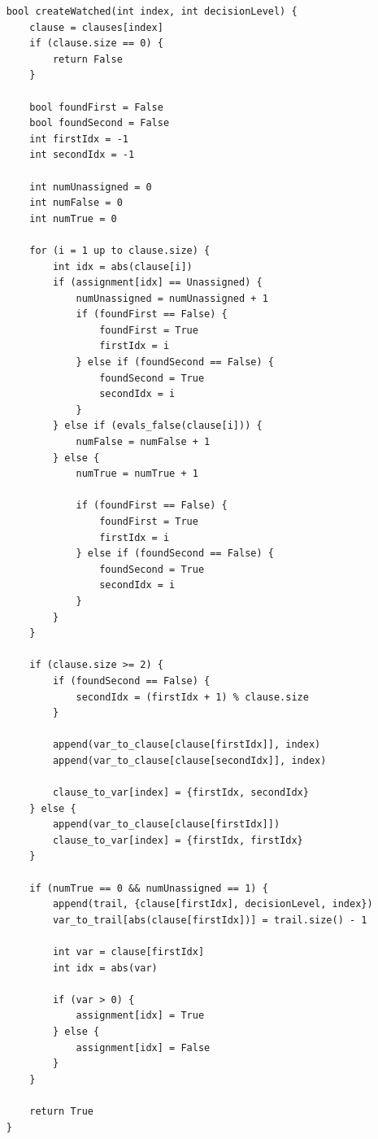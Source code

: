 \documentclass[../main.tex]{subfiles}
\begin{document}
\begin{lstlisting}
    bool createWatched(int index, int decisionLevel) {
        clause = clauses[index]
        if (clause.size == 0) {
            return False
        }

        bool foundFirst = False 
        bool foundSecond = False 
        int firstIdx = -1
        int secondIdx = -1

        int numUnassigned = 0
        int numFalse = 0
        int numTrue = 0

        for (i = 1 up to clause.size) {
            int idx = abs(clause[i])
            if (assignment[idx] == Unassigned) {
                numUnassigned = numUnassigned + 1
                if (foundFirst == False) {
                    foundFirst = True
                    firstIdx = i
                } else if (foundSecond == False) {
                    foundSecond = True 
                    secondIdx = i
                }
            } else if (evals_false(clause[i])) {
                numFalse = numFalse + 1
            } else {
                numTrue = numTrue + 1

                if (foundFirst == False) {
                    foundFirst = True
                    firstIdx = i
                } else if (foundSecond == False) {
                    foundSecond = True 
                    secondIdx = i
                }
            }
        }

        if (clause.size >= 2) {
            if (foundSecond == False) {
                secondIdx = (firstIdx + 1) % clause.size
            }

            append(var_to_clause[clause[firstIdx]], index)
            append(var_to_clause[clause[secondIdx]], index)
            
            clause_to_var[index] = {firstIdx, secondIdx}
        } else {
            append(var_to_clause[clause[firstIdx]])
            clause_to_var[index] = {firstIdx, firstIdx}
        }

        if (numTrue == 0 && numUnassigned == 1) {
            append(trail, {clause[firstIdx], decisionLevel, index})
            var_to_trail[abs(clause[firstIdx])] = trail.size() - 1

            int var = clause[firstIdx]
            int idx = abs(var)

            if (var > 0) {
                assignment[idx] = True
            } else {
                assignment[idx] = False
            }
        }

        return True
    }
\end{lstlisting}
\end{document}

